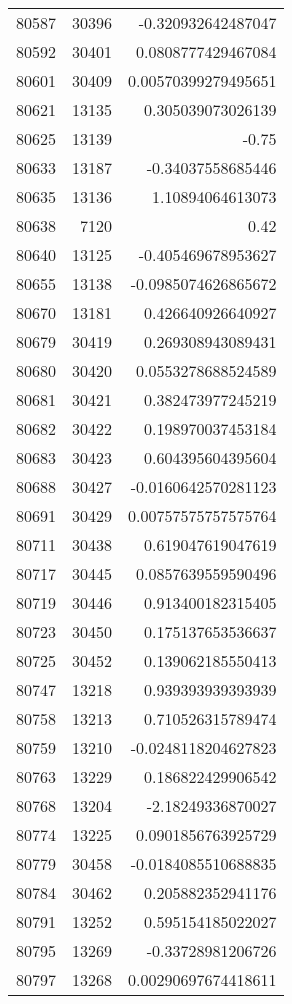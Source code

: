 \begin{tabular}{r | r | r}
80587 & 30396 & -0.320932642487047 \\
80592 & 30401 & 0.0808777429467084 \\
80601 & 30409 & 0.00570399279495651 \\
80621 & 13135 & 0.305039073026139 \\
80625 & 13139 & -0.75 \\
80633 & 13187 & -0.34037558685446 \\
80635 & 13136 & 1.10894064613073 \\
80638 & 7120 & 0.42 \\
80640 & 13125 & -0.405469678953627 \\
80655 & 13138 & -0.0985074626865672 \\
80670 & 13181 & 0.426640926640927 \\
80679 & 30419 & 0.269308943089431 \\
80680 & 30420 & 0.0553278688524589 \\
80681 & 30421 & 0.382473977245219 \\
80682 & 30422 & 0.198970037453184 \\
80683 & 30423 & 0.604395604395604 \\
80688 & 30427 & -0.0160642570281123 \\
80691 & 30429 & 0.00757575757575764 \\
80711 & 30438 & 0.619047619047619 \\
80717 & 30445 & 0.0857639559590496 \\
80719 & 30446 & 0.913400182315405 \\
80723 & 30450 & 0.175137653536637 \\
80725 & 30452 & 0.139062185550413 \\
80747 & 13218 & 0.939393939393939 \\
80758 & 13213 & 0.710526315789474 \\
80759 & 13210 & -0.0248118204627823 \\
80763 & 13229 & 0.186822429906542 \\
80768 & 13204 & -2.18249336870027 \\
80774 & 13225 & 0.0901856763925729 \\
80779 & 30458 & -0.0184085510688835 \\
80784 & 30462 & 0.205882352941176 \\
80791 & 13252 & 0.595154185022027 \\
80795 & 13269 & -0.33728981206726 \\
80797 & 13268 & 0.00290697674418611 \\

\end{tabular}
